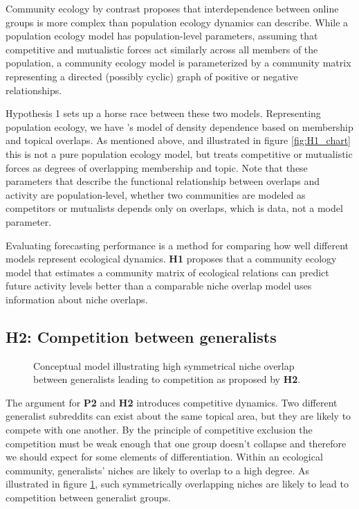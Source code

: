\documentclass[12pt]{memoir}
\begin{document}
Community ecology by contrast proposes that interdependence between online groups is more complex than population ecology dynamics can describe.  While a population ecology model has population-level parameters, assuming that competitive and mutualistic forces act similarly across all members of the population, a community ecology model is parameterized by a community matrix representing a directed (possibly cyclic) graph of positive or negative relationships. 

Hypothesis 1 sets up a horse race between these two models.  Representing population ecology, we have \citet{zhu_selecting_2014}'s model of density dependence based on membership and topical overlaps.  As mentioned above, and illustrated in figure \ref{fig:H1_chart} this is not a pure population ecology model, but treats competitive or mutualistic forces as degrees of overlapping membership and topic. Note that these parameters that describe the functional relationship between overlaps and activity are population-level, whether two communities are modeled as competitors or mutualists depends only on overlaps, which is data, not a model parameter.

Evaluating forecasting performance is a method for comparing how well different models represent ecological dynamics. \textbf{H1} proposes that a community ecology model that estimates a community matrix of ecological relations can predict future activity levels better than a comparable niche overlap model uses information about niche overlaps.

\subsection{\textbf{H2:} Competition between generalists}

\begin{figure}[b]
\centering

\caption{Conceptual model illustrating high symmetrical niche overlap between generalists leading to competition as proposed by \textbf{H2}. \label{fig:H2_chart}}
\end{figure}

The argument for \textbf{P2} and \textbf{H2} introduces competitive dynamics.  Two different generalist subreddits can exist about the same topical area, but they are likely to compete with one another.  By the principle of competitive exclusion the competition must be weak enough that one group doesn't collapse and therefore we should expect for some elements of differentiation.  Within an ecological community, generalists' niches are likely to overlap to a high degree.  As illustrated in figure \ref{fig:H2_chart}, such symmetrically overlapping niches are likely to lead to competition between generalist groups.
\end{document}
